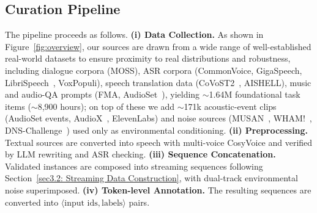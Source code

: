 \documentclass{llmxive}
\begin{document}

\vspace{-2.4mm}
\subsection{Curation Pipeline}
\label{sec:curation_pipeline}
\vspace{-2mm}

The pipeline proceeds as follows. \textbf{(i) Data Collection.} As shown in
Figure~\ref{fig:overview}, our sources are drawn from a wide range of well-established
real-world datasets to ensure proximity to real distributions and robustness, including
dialogue corpora (MOSS), ASR corpora (CommonVoice, GigaSpeech,
LibriSpeech~\citep{panayotov2015librispeech}, VoxPopuli), speech translation data
(CoVoST2~\citep{wang2021covost}, AISHELL), music and audio-QA prompts (FMA,
AudioSet~\citep{gemmeke2017audio}), yielding $\sim$1.64M foundational task items
($\sim$8{,}900 hours); on top of these we add $\sim$171k acoustic-event clips
(AudioSet events, AudioX~\citep{tian2025audiox}, ElevenLabs) and noise sources
(MUSAN~\citep{snyder2015musan}, WHAM!~\citep{wichern2019wham},
DNS-Challenge~\citep{timcheck2023intel}) used only as environmental conditioning.
\textbf{(ii) Preprocessing.} Textual sources are converted into speech with multi-voice
CosyVoice and verified by LLM rewriting and ASR checking. \textbf{(iii) Sequence
Concatenation.} Validated instances are composed into streaming sequences following
Section~\ref{sec3.2: Streaming Data Construction}, with dual-track environmental noise
superimposed. \textbf{(iv) Token-level Annotation.} The resulting sequences are converted
into $\langle\text{input ids}, \text{labels}\rangle$ pairs.
\end{document}
